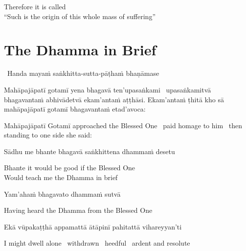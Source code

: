 \begin{english}
  Therefore it is called\\
  ``Such is the origin of this whole mass of suffering''
\end{english}

\suttaRef{[Vibh 130 / SN 12.2]}


\section{The Dhamma in Brief}
\label{dhamma-in-brief}

\begin{leader}
  \anglebracketleft\ \hspace{-0.5mm}Handa mayaṁ saṅkhitta-sutta-pāṭhaṁ bhaṇāmase \hspace{-0.5mm}\anglebracketright\
\end{leader}

\begin{pali-hang}
  Mahāpajāpatī gotamī yena bhagavā ten'upasaṅkami \breathmark\ upasaṅkamitvā bhagavantaṁ abhivādetvā ekam'antaṁ aṭṭhāsi. Ekam'antaṁ ṭhitā kho sā mahāpajāpatī gotamī bhagavantaṁ etad'avoca:
\end{pali-hang}

\begin{english-hang}
  Mahāpajāpatī Gotamī approached the Blessed One \breathmark\ paid homage to him \breathmark\ then standing to one side she said:
\end{english-hang}

Sādhu me bhante bhagavā saṅkhittena dhammaṁ desetu

\begin{english}
  Bhante it would be good if the Blessed One\\
  Would teach me the Dhamma in brief
\end{english}

Yam'ahaṁ bhagavato dhammaṁ sutvā

\begin{english}
  Having heard the Dhamma from the Blessed One
\end{english}

Ekā vūpakaṭṭhā appamattā ātāpinī pahitattā vihareyyan'ti

\begin{english}
  I might dwell alone \breathmark\ withdrawn \breathmark\ heedful \breathmark\ ardent and resolute
\end{english}

